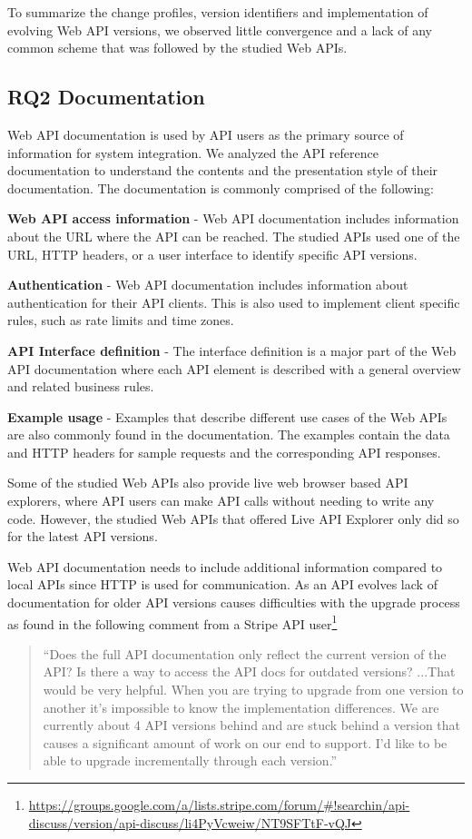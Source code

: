 \documentclass[conference]{IEEEtran}
\begin{document}
To summarize the change profiles, version identifiers and implementation of evolving Web API versions, we observed little convergence and a lack of any common scheme that was followed by the studied Web APIs.

\subsection{RQ2 Documentation} %
\label{sub:documentation}
Web API documentation is used by API users as the primary source of information for system integration. We analyzed the API reference documentation to understand the contents and the presentation style of their documentation. The documentation is commonly comprised of the following:

\textbf{Web API access information} - Web API documentation includes information about the URL where the API can be reached. The studied APIs used one of the URL, HTTP headers, or a user interface to identify specific API versions.

\textbf{Authentication} - Web API documentation includes information about authentication for their API clients. This is also used to implement client specific rules, such as rate limits and time zones.

\textbf{API Interface definition} - The interface definition is a major part of the Web API documentation where each API element is described with a general overview  and related business rules.

\textbf{Example usage} - Examples that describe different use cases of the Web APIs are also commonly found in the documentation. The examples contain the data and HTTP headers for sample requests and the corresponding API responses.

Some of the studied Web APIs also provide live web browser based API explorers, where API users can make API calls without needing to write any code. However, the studied Web APIs that offered Live API Explorer only did so for the latest API versions.

Web API documentation needs to include additional information compared to local APIs since HTTP is used for communication. As an API evolves lack of documentation for older API versions causes difficulties with the upgrade process as found in the following comment from a Stripe API user\footnote{\url{https://groups.google.com/a/lists.stripe.com/forum/#!searchin/api-discuss/version/api-discuss/li4PyVcweiw/NT9SFTtF-vQJ}}

\small
\begin{quotation}
 ``Does the full API documentation only reflect the current version of the
  API?  Is there a way to access the API docs for outdated versions? ...That would be very helpful. When you are trying to upgrade from one version to another it's impossible to know the implementation differences. We are currently about 4 API versions behind and are stuck behind a version that causes a significant amount of work on our end to support. I'd like to be able to upgrade incrementally through each version.''
\end{quotation}
\normalsize
\end{document}
